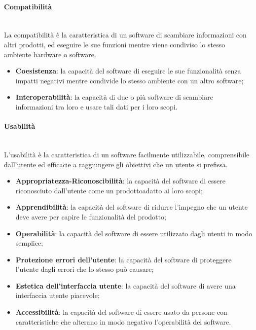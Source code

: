 	\paragraph{Compatibilità} \mbox{}\\
	La compatibilità è la caratteristica di un software di scambiare informazioni con altri prodotti\glo, ed eseguire le sue funzioni mentre viene condiviso lo stesso ambiente hardware o software.
	\begin{itemize}
		\item \textbf{Coesistenza}: la capacità del software di eseguire le sue funzionalità senza impatti negativi mentre condivide lo stesso ambiente con un altro software;
		\item \textbf{Interoperabilità}: la capacità di due o più software di scambiare informazioni tra loro e usare tali dati per i loro scopi.
	\end{itemize}
	\paragraph{Usabilità} \mbox{}\\
	L'usabilità è la caratteristica di un software facilmente utilizzabile, comprensibile dall'utente ed efficacie a raggiungere gli obiettivi che un utente si prefissa.
	\begin{itemize}
		\item \textbf{Appropriatezza-Riconoscibilità}: la capacità del software di essere riconosciuto dall'utente come un prodotto\glosp adatto ai loro scopi;
		\item \textbf{Apprendibilità}: la capacità del software di ridurre l'impegno che un utente deve avere per capire le funzionalità del prodotto\glo ;
		\item \textbf{Operabilità}: la capacità del software di essere utilizzato dagli utenti in modo semplice;
		\item \textbf{Protezione errori dell'utente}: la capacità del software di proteggere l'utente dagli errori che lo stesso può causare;
		\item \textbf{Estetica dell'interfaccia utente}: la capacità del software di avere una interfaccia utente piacevole;
		\item \textbf{Accessibilità}: la capacità del software di essere usato da persone con caratteristiche che alterano in modo negativo l'operabilità del software.
	\end{itemize}
